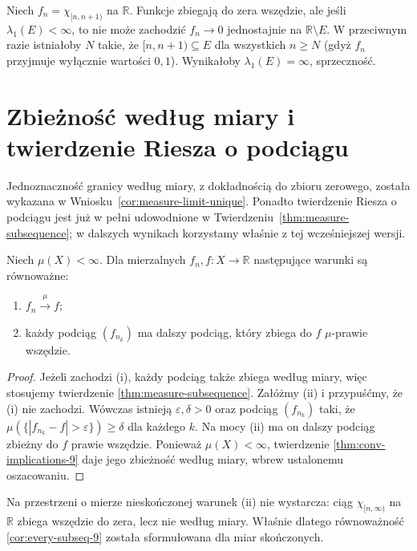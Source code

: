 \begin{przyklad}
Niech $f_n=\chi_{[n,n+1)}$ na $\mathbb R$.
Funkcje zbiegają do zera wszędzie, ale jeśli
$\lambda_1(E)<\infty$, to nie może zachodzić
$f_n\to0$ jednostajnie na $\mathbb R\setminus E$.
W przeciwnym razie istniałoby $N$ takie, że
$[n,n+1)\subseteq E$ dla wszystkich $n\ge N$
(gdyż $f_n$ przyjmuje wyłącznie wartości $0,1$).
Wynikałoby $\lambda_1(E)=\infty$, sprzeczność.
\end{przyklad}

\section{Zbieżność według miary i twierdzenie Riesza o podciągu}

Jednoznaczność granicy według miary, z dokładnością do zbioru zerowego,
została wykazana w Wniosku~\ref{cor:measure-limit-unique}.
Ponadto twierdzenie Riesza o podciągu jest już w pełni
udowodnione w Twierdzeniu~\ref{thm:measure-subsequence};
w dalszych wynikach korzystamy właśnie z tej wcześniejszej wersji.

\begin{wniosek}
\label{cor:every-subseq-9}
Niech $\mu(X)<\infty$. Dla mierzalnych
$f_n,f:X\to\mathbb R$ następujące
warunki są równoważne:
\begin{enumerate}[label=\textup{(\roman*)}]
\item $f_n\xrightarrow{\mu}f$;
\item każdy podciąg $(f_{n_k})$ ma dalszy podciąg,
który zbiega do $f$ $\mu$-prawie wszędzie.
\end{enumerate}
\end{wniosek}
\begin{proof}
Jeżeli zachodzi (i), każdy podciąg także zbiega
według miary, więc stosujemy twierdzenie
\ref{thm:measure-subsequence}.
Załóżmy (ii) i przypuśćmy, że (i) nie zachodzi.
Wówczas istnieją $\varepsilon,\delta>0$ oraz
podciąg $(f_{n_k})$ taki, że
$\mu(\{|f_{n_k}-f|>\varepsilon\})\ge\delta$
dla każdego $k$. Na mocy (ii) ma on dalszy
podciąg zbieżny do $f$ prawie wszędzie.
Ponieważ $\mu(X)<\infty$, twierdzenie
\ref{thm:conv-implications-9} daje jego zbieżność
według miary, wbrew ustalonemu oszacowaniu.
\end{proof}

\begin{uwaga}
Na przestrzeni o mierze nieskończonej warunek (ii)
nie wystarcza: ciąg $\chi_{[n,\infty)}$ na
$\mathbb R$ zbiega wszędzie do zera, lecz nie
według miary. Właśnie dlatego równoważność
\ref{cor:every-subseq-9} została sformułowana
dla miar skończonych.
\end{uwaga}

